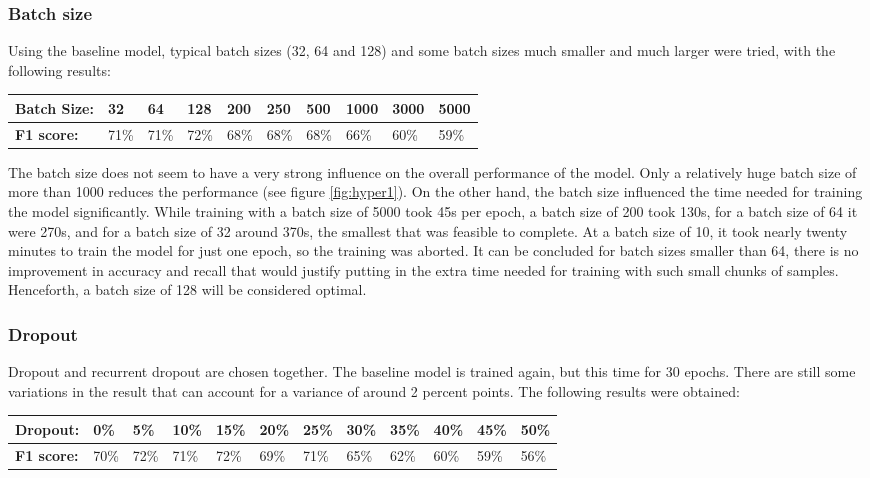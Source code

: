 \documentclass[
a4paper,
pagesize,
pdftex,
12pt,
twoside, %
BCOR=5mm, %
ngerman,
fleqn,
final,
]{scrartcl}
\begin{document}
	\subsubsection{Batch size}
	Using the baseline model, typical batch sizes (32, 64 and 128) and some batch sizes much smaller and much larger were tried, with the following results: 
	
	\begin{tabular} { | p{3cm} || p{0.8cm} | p{0.8cm}  | p{0.8cm}  |p{0.8cm} | p{0.8cm} | p{0.8cm} | p{0.8cm} | p{0.8cm}| p{0.8cm} |}
		\hline
		\textbf{Batch Size:}  &  32 & 64 & 128 & 200 & 250 & 500 & 1000 & 3000 &5000\\   
		\hline
		\textbf{F1 score:} & 71\% & 71\% & 72\% & 68\% & 68\% & 68\% & 66\% & 60\% & 59\%\\
		\hline
		\hline
	\end{tabular}
	
	The batch size does not seem to have a very strong influence on the overall performance of the model. Only a relatively huge batch size of more than 1000 reduces the performance (see figure \ref{fig:hyper1}). On the other hand, the batch size influenced the time needed for training the model significantly. While training with a batch size of 5000 took 45s per epoch, a batch size of 200 took 130s, for a batch size of 64 it were 270s, and for a batch size of 32 around 370s, the smallest that was feasible to complete. At a batch size of 10, it took nearly twenty minutes to train the model for just one epoch, so the training was aborted. It can be concluded for batch sizes smaller than 64, there is no improvement in accuracy and recall that would justify putting in the extra time needed for training with such small chunks of samples. Henceforth, a batch size of 128 will be considered optimal.

	\subsubsection{Dropout}
	Dropout and recurrent dropout are chosen together. The baseline model is trained again, but this time for 30 epochs. There are still some variations in the result that can account for a variance of around 2 percent points. The following results were obtained:
	
	\begin{tabular} { | p{2cm} || p{0.7cm} | p{0.7cm} | p{0.7cm} | p{0.7cm}  | p{0.7cm} | p{0.7cm} | p{0.7cm} | p{0.7cm} | p{0.7cm} | p{0.7cm} | p{0.7cm} |}
		\hline
		\textbf{Dropout:}  & 0\% & 5\% & 10\% & 15\%   & 20\% & 25\% & 30\% & 35\% & 40\% & 45\% & 50\% \\   
		\hline
		\textbf{F1 score:} & 70\% & 72\% & 71\% & 72\% & 69\% & 71\% & 65\% & 62\% & 60\% & 59\% & 56\% \\
		\hline
		\hline
	\end{tabular}
	
\end{document}
